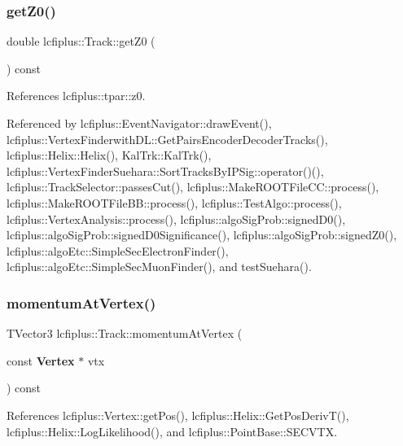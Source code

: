 \subsubsection{get\+Z0()}
{\footnotesize\ttfamily double lcfiplus\+::\+Track\+::get\+Z0 (\begin{DoxyParamCaption}{ }\end{DoxyParamCaption}) const\hspace{0.3cm}{\ttfamily [inline]}}



References lcfiplus\+::tpar\+::z0.



Referenced by lcfiplus\+::\+Event\+Navigator\+::draw\+Event(), lcfiplus\+::\+Vertex\+Finderwith\+D\+L\+::\+Get\+Pairs\+Encoder\+Decoder\+Tracks(), lcfiplus\+::\+Helix\+::\+Helix(), Kal\+Trk\+::\+Kal\+Trk(), lcfiplus\+::\+Vertex\+Finder\+Suehara\+::\+Sort\+Tracks\+By\+I\+P\+Sig\+::operator()(), lcfiplus\+::\+Track\+Selector\+::passes\+Cut(), lcfiplus\+::\+Make\+R\+O\+O\+T\+File\+C\+C\+::process(), lcfiplus\+::\+Make\+R\+O\+O\+T\+File\+B\+B\+::process(), lcfiplus\+::\+Test\+Algo\+::process(), lcfiplus\+::\+Vertex\+Analysis\+::process(), lcfiplus\+::algo\+Sig\+Prob\+::signed\+D0(), lcfiplus\+::algo\+Sig\+Prob\+::signed\+D0\+Significance(), lcfiplus\+::algo\+Sig\+Prob\+::signed\+Z0(), lcfiplus\+::algo\+Etc\+::\+Simple\+Sec\+Electron\+Finder(), lcfiplus\+::algo\+Etc\+::\+Simple\+Sec\+Muon\+Finder(), and test\+Suehara().

\mbox{\label{classlcfiplus_1_1Track_a0831ab232f865aa93a127ef3e5814502}} 
\subsubsection{momentum\+At\+Vertex()}
{\footnotesize\ttfamily T\+Vector3 lcfiplus\+::\+Track\+::momentum\+At\+Vertex (\begin{DoxyParamCaption}\item[{const \textbf{ Vertex} $\ast$}]{vtx }\end{DoxyParamCaption}) const}



References lcfiplus\+::\+Vertex\+::get\+Pos(), lcfiplus\+::\+Helix\+::\+Get\+Pos\+Deriv\+T(), lcfiplus\+::\+Helix\+::\+Log\+Likelihood(), and lcfiplus\+::\+Point\+Base\+::\+S\+E\+C\+V\+TX.



